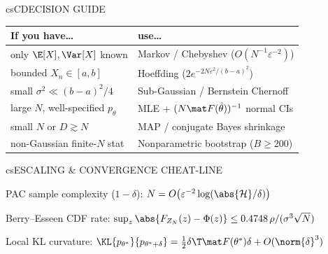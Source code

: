 \documentclass[../../../../master.tex]{subfiles}
\begin{document}
\begin{cscolumns}
\begin{cscard}{csC}{DECISION GUIDE}
  \renewcommand{\arraystretch}{1.22}\small
  \begin{tabular}{@{}>{\raggedright\arraybackslash}p{3.2cm}>{\raggedright\arraybackslash}p{4.7cm}@{}}
    \textbf{If you have\ldots} & \textbf{use\ldots}\\ \hline
    only $\E[X],\Var[X]$ known & Markov / Chebyshev ($O(N^{-1}\varepsilon^{-2})$)\\
    bounded $X_n\in[a,b]$ & Hoeffding ($2e^{-2N\varepsilon^2/(b-a)^2}$)\\
    small $\sigma^2 \ll (b-a)^2/4$ & Sub-Gaussian / Bernstein Chernoff\\
    large $N$, well-specified $p_\theta$ & MLE + $(N\mat F(\hat\theta))^{-1}$ normal CIs\\
    small $N$ or $D\gtrsim N$ & MAP / conjugate Bayes shrinkage\\
    non-Gaussian finite-$N$ stat & Nonparametric bootstrap ($B\ge 200$)\\
  \end{tabular}
\end{cscard}

\begin{cscard}{csE}{SCALING \& CONVERGENCE CHEAT-LINE}
  \begin{csbul}
    \item PAC sample complexity ($1-\delta$): $N = O\bigl(\varepsilon^{-2}\log(\abs{\mathcal H}/\delta)\bigr)$
    \item Berry--Esseen CDF rate: $\sup_z\abs{F_{Z_N}(z)-\Phi(z)} \le 0.4748\,\rho/(\sigma^3\sqrt N)$
    \item Local KL curvature: $\KL{p_{\theta^*}}{p_{\theta^*+\delta}} = \frac{1}{2}\delta\T\mat F(\theta^*)\delta + O(\norm{\delta}^3)$
  \end{csbul}
\end{cscard}


\end{cscolumns}
\end{document}
